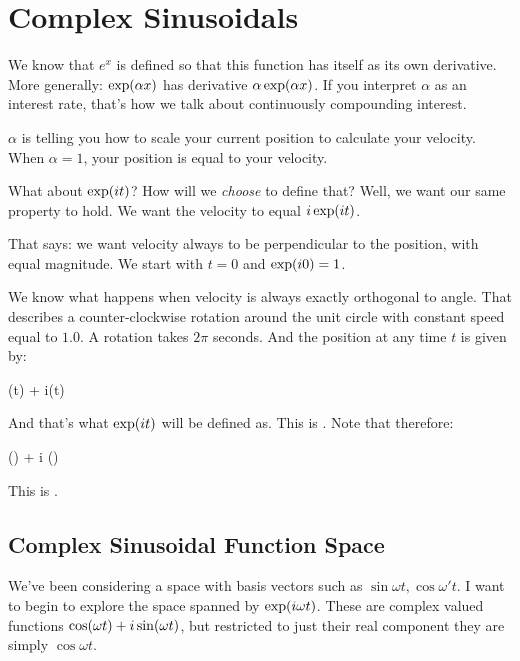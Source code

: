 \section{Complex Sinusoidals}

We know that $e^x$ is defined so that this function has itself as its
own derivative. More generally: $\exp\mathopen{}\left( {\alpha x} \right)\mathclose{}$ has derivative
$\alpha \exp\mathopen{}\left( {\alpha x} \right)\mathclose{}$. If you interpret $\alpha$ as an
interest rate, that's how we talk about continuously compounding
interest.

$\alpha$ is telling you how to scale your current position to calculate
your velocity. When $\alpha = 1$, your position is equal to your
velocity.

What about $\exp\mathopen{}\left( {it} \right)\mathclose{}$? How will we \emph{choose} to define that?
Well, we want our same property to hold. We want the velocity to equal
$i\exp\mathopen{}\left( {it} \right)\mathclose{}$.

That says: we want velocity always to be perpendicular to the position,
with equal magnitude. We start with $t = 0$ and $\exp\mathopen{}\left( {i0} \right)\mathclose{} = 1$.

We know what happens when velocity is always exactly orthogonal to
angle. That describes a counter-clockwise rotation around the unit
circle with constant speed equal to $1.0$. A rotation takes $2\pi$
seconds. And the position at any time $t$ is given by:

\begin{nedqn}
  \cos(t) + i\sin(t)
\end{nedqn}

\noindent
And that's what $\exp\mathopen{}\left( {it} \right)\mathclose{}$ will be defined as. This is . Note that therefore:

\begin{nedqn}
\eqcol
  \cos(\pi) + i \sin(\pi)
\\
\end{nedqn}

\noindent
This is .

\subsection{Complex Sinusoidal Function Space}

We've been considering a space with basis vectors such as $\sin \omega
t, \cos \omega' t$. I want to begin to explore the space spanned by
$\exp\mathopen{}\left( {i \omega t} \right)\mathclose{}$. These are complex valued functions $\cos\mathopen{}\left( {\omega t} \right)\mathclose{}
+ i \sin\mathopen{}\left( {\omega t} \right)\mathclose{}$, but restricted to just their real component they
are simply $\cos \omega t$.

